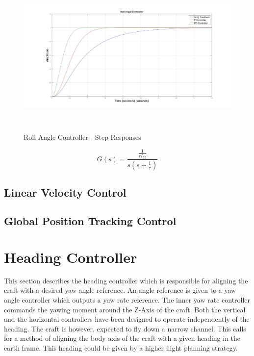 		\begin{figure}[H]
			\centering
			\includegraphics[height = 8cm]{../Design/Matlab/Controllers/roll_angle_step.jpg}
			\caption{Roll Angle Controller -  Step Responses}
			\label{IM_RollAngleStep}
		\end{figure}
		
		\begin{equation}
		\label{EQ_RollAngleTF}
		G(s) = \frac{\frac{1}{\tau I_{zz}}}{s (s + \frac{1}{\tau})}
		\end{equation}
	
	
	\subsection{Linear Velocity Control}
	
	\subsection{Global Position Tracking Control}
	
\section{Heading Controller}
This section describes the heading controller which is responsible for aligning the craft with a desired yaw angle reference. An angle reference is given to a yaw angle controller which outputs a yaw rate reference. The inner yaw rate controller commands the yawing moment around the Z-Axis of the craft. Both the vertical and the horizontal controllers have been designed to operate independently of the heading. The craft is however, expected to fly down a narrow channel. This calls for a method of aligning the body axis of the craft with a given heading in the earth frame. This heading could be given by a higher flight planning strategy.

